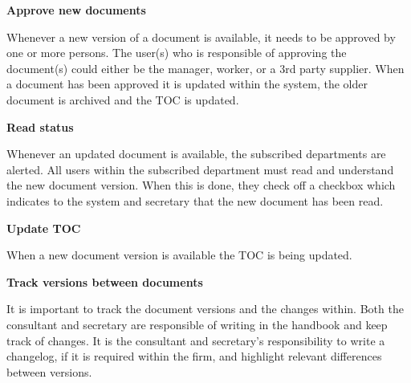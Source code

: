 \textbf{Approve new documents}

Whenever a new version of a document is available, it needs to be approved by one or more persons.
The user(s) who is responsible of approving the document(s) could either be the manager, worker, or a 3rd party supplier.
When a document has been approved it is updated within the system, the older document is archived and the TOC is updated.

\textbf{Read status}

Whenever an updated document is available, the subscribed departments are alerted.
All users within the subscribed department must read and understand the new document version.
When this is done, they check off a checkbox which indicates to the system and secretary that the new document has been read.


\textbf{Update TOC}

When a new document version is available the TOC is being updated.

\textbf{Track versions between documents}

It is important to track the document versions and the changes within.
Both the consultant and secretary are responsible of writing in the handbook and keep track of changes.
It is the consultant and secretary’s responsibility to write a changelog, if it is required within the firm, and highlight relevant differences between versions.


